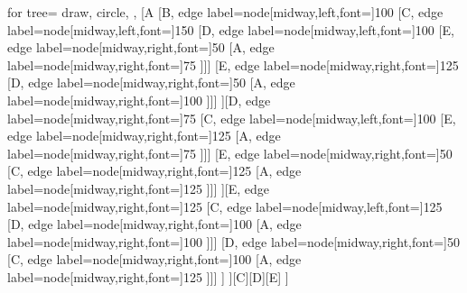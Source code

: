 		\begin{forest}
		  for tree={
		    draw,
		    circle,
		  },
		  [A
		  	[B, edge label={node[midway,left,font=\scriptsize]{100}}
		  		[C, edge label={node[midway,left,font=\scriptsize]{150}}
		  			[D, edge label={node[midway,left,font=\scriptsize]{100}}
		  				[E, edge label={node[midway,right,font=\scriptsize]{50}}
		  					[A, edge label={node[midway,right,font=\scriptsize]{75}}
		  					]]]
		  			[E, edge label={node[midway,right,font=\scriptsize]{125}}
		  				[D, edge label={node[midway,right,font=\scriptsize]{50}}
		  					[A, edge label={node[midway,right,font=\scriptsize]{100}}
		  					]]]
		  		][D, edge label={node[midway,right,font=\scriptsize]{75	}}
		  			[C, edge label={node[midway,left,font=\scriptsize]{100}}
		  				[E, edge label={node[midway,right,font=\scriptsize]{125}}
		  					[A, edge label={node[midway,right,font=\scriptsize]{75}}
		  					]]]
		  			[E, edge label={node[midway,right,font=\scriptsize]{50}}
		  				[C, edge label={node[midway,right,font=\scriptsize]{125}}
		  					[A, edge label={node[midway,right,font=\scriptsize]{125}}
		  					]]]
		  		][E, edge label={node[midway,right,font=\scriptsize]{125}}
					[C, edge label={node[midway,left,font=\scriptsize]{125}}
						[D, edge label={node[midway,right,font=\scriptsize]{100}}
							[A, edge label={node[midway,right,font=\scriptsize]{100}}
							]]]
					[D, edge label={node[midway,right,font=\scriptsize]{50}}
						[C, edge label={node[midway,right,font=\scriptsize]{100}}
							[A, edge label={node[midway,right,font=\scriptsize]{125}}
							]]]  		
		  		]
		  	][C][D][E]
		  ]
		\end{forest}